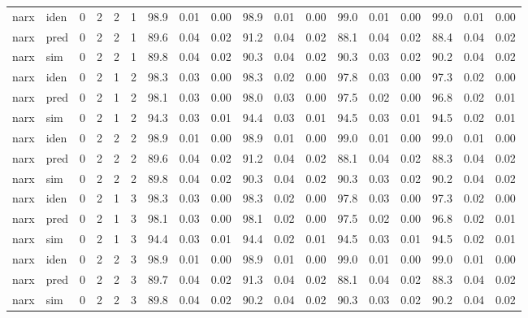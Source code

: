 \begin{landscape}
\begin{center}
\begin{longtable}{ll|cccc|ccc|ccc|ccc|ccc}
 \hline 
narx & iden & 0 & 2 & 2 & 1 & 98.9 & 0.01 & 0.00 & 98.9 & 0.01 & 0.00 & 99.0 & 0.01 & 0.00 & 99.0 & 0.01 & 0.00 \\ 
narx & pred & 0 & 2 & 2 & 1 & 89.6 & 0.04 & 0.02 & 91.2 & 0.04 & 0.02 & 88.1 & 0.04 & 0.02 & 88.4 & 0.04 & 0.02 \\ 
narx & sim  & 0 & 2 & 2 & 1 & 89.8 & 0.04 & 0.02 & 90.3 & 0.04 & 0.02 & 90.3 & 0.03 & 0.02 & 90.2 & 0.04 & 0.02 \\ 
 \hline 
narx & iden & 0 & 2 & 1 & 2 & 98.3 & 0.03 & 0.00 & 98.3 & 0.02 & 0.00 & 97.8 & 0.03 & 0.00 & 97.3 & 0.02 & 0.00 \\ 
narx & pred & 0 & 2 & 1 & 2 & 98.1 & 0.03 & 0.00 & 98.0 & 0.03 & 0.00 & 97.5 & 0.02 & 0.00 & 96.8 & 0.02 & 0.01 \\ 
narx & sim  & 0 & 2 & 1 & 2 & 94.3 & 0.03 & 0.01 & 94.4 & 0.03 & 0.01 & 94.5 & 0.03 & 0.01 & 94.5 & 0.02 & 0.01 \\ 
 \hline 
narx & iden & 0 & 2 & 2 & 2 & 98.9 & 0.01 & 0.00 & 98.9 & 0.01 & 0.00 & 99.0 & 0.01 & 0.00 & 99.0 & 0.01 & 0.00 \\ 
narx & pred & 0 & 2 & 2 & 2 & 89.6 & 0.04 & 0.02 & 91.2 & 0.04 & 0.02 & 88.1 & 0.04 & 0.02 & 88.3 & 0.04 & 0.02 \\ 
narx & sim  & 0 & 2 & 2 & 2 & 89.8 & 0.04 & 0.02 & 90.3 & 0.04 & 0.02 & 90.3 & 0.03 & 0.02 & 90.2 & 0.04 & 0.02 \\ 
 \hline 
narx & iden & 0 & 2 & 1 & 3 & 98.3 & 0.03 & 0.00 & 98.3 & 0.02 & 0.00 & 97.8 & 0.03 & 0.00 & 97.3 & 0.02 & 0.00 \\ 
narx & pred & 0 & 2 & 1 & 3 & 98.1 & 0.03 & 0.00 & 98.1 & 0.02 & 0.00 & 97.5 & 0.02 & 0.00 & 96.8 & 0.02 & 0.01 \\ 
narx & sim  & 0 & 2 & 1 & 3 & 94.4 & 0.03 & 0.01 & 94.4 & 0.02 & 0.01 & 94.5 & 0.03 & 0.01 & 94.5 & 0.02 & 0.01 \\ 
 \hline 
narx & iden & 0 & 2 & 2 & 3 & 98.9 & 0.01 & 0.00 & 98.9 & 0.01 & 0.00 & 99.0 & 0.01 & 0.00 & 99.0 & 0.01 & 0.00 \\ 
narx & pred & 0 & 2 & 2 & 3 & 89.7 & 0.04 & 0.02 & 91.3 & 0.04 & 0.02 & 88.1 & 0.04 & 0.02 & 88.3 & 0.04 & 0.02 \\ 
narx & sim  & 0 & 2 & 2 & 3 & 89.8 & 0.04 & 0.02 & 90.2 & 0.04 & 0.02 & 90.3 & 0.03 & 0.02 & 90.2 & 0.04 & 0.02 \\ 
 \hline 
\end{longtable} 
\normalsize \end{center} 
 \end{landscape}